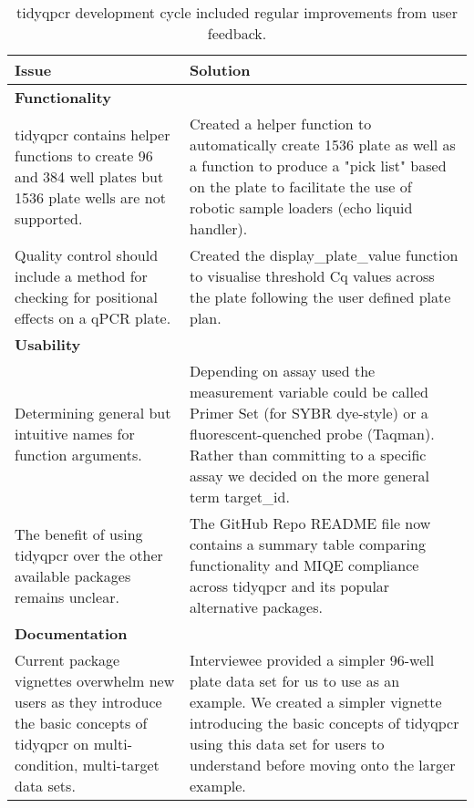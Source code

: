 \documentclass[../main.tex]{subfiles}
\begin{document}
\begin{table}
\centering
\begin{tabular}{|| m{4.5cm} | m{7cm} ||} 
 \hline
 \textbf{\large Issue} & \textbf{\large Solution} \\ [0.5ex] 
 \hline\hline
 \multicolumn{2}{|l|}{\textbf{Functionality}} \\
 \hline
 tidyqpcr contains helper functions to create 96 and 384 well plates but 1536 plate wells are not supported. & 
 Created a helper function to automatically create 1536 plate as well as a function to produce a "pick list" based on the plate to facilitate the use of robotic sample loaders (echo liquid handler). \\ 
 \hline
 Quality control should include a method for checking for positional effects on a qPCR plate. & 
 Created the display\_plate\_value function to visualise threshold Cq values across the plate following the user defined plate plan. \\
 \hline
 \multicolumn{2}{|l|}{\textbf{Usability}} \\
 \hline
 Determining general but intuitive names for function arguments. & 
 Depending on assay used the measurement variable could be called Primer Set (for SYBR dye-style) or a fluorescent-quenched probe (Taqman). 
 Rather than committing to a specific assay we decided on the more general term target\_id. \\
 \hline
 The benefit of using tidyqpcr over the other available packages remains unclear. & 
 The GitHub Repo README file now contains a summary table comparing functionality and MIQE compliance across tidyqpcr and its popular alternative packages.\\
 \hline
 \multicolumn{2}{|l|}{\textbf{Documentation}} \\
 \hline
 Current package vignettes overwhelm new users as they introduce the basic concepts of tidyqpcr on multi-condition, multi-target data sets. & 
 Interviewee provided a simpler 96-well plate data set for us to use as an example. 
 We created a simpler vignette introducing the basic concepts of tidyqpcr using this data set for users to understand before moving onto the larger example. \\
 \hline
\end{tabular}
\caption[tidyqpcr development cycle included regular improvements from user feedback.]{tidyqpcr development cycle included regular improvements from user feedback.}
\label{user-feedback}
\end{table}
\end{document}
